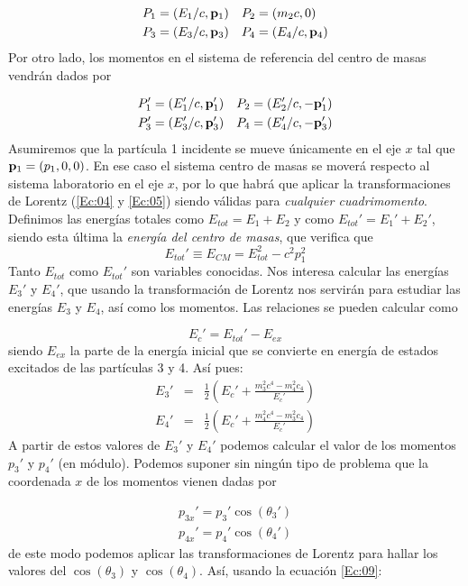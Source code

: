 \begin{eqnarray}
    P_1 = (E_1/c,\mathbf{p}_1) & \quad P_2 = (m_2c,0) \\
    P_3 = (E_3/c,\mathbf{p}_3) & \quad P_4 = (E_4/c,\mathbf{p}_4)
\end{eqnarray}
Por otro lado, los momentos en el sistema de referencia del centro de masas vendrán dados por

\begin{eqnarray}
    P_1' = (E_1'/c,\mathbf{p}_1') \quad P_2 = (E_2'/c,-\mathbf{p}_1') \\ 
    P_3' = (E_3'/c,\mathbf{p}_3') \quad P_4 = (E_4'/c,-\mathbf{p}_3')
\end{eqnarray}
Asumiremos que la partícula 1 incidente se mueve únicamente en el eje $x$ tal que $\mathbf{p}_1=(p_1,0,0)$. En ese caso el sistema centro de masas se moverá respecto al sistema laboratorio en el eje $x$, por lo que habrá que aplicar la transformaciones de Lorentz (\ref{Ec:04} y \ref{Ec:05}) siendo válidas para \textit{cualquier cuadrimomento}. Definimos las energías totales como $E_{tot}=E_1+E_2$ y como  $E_{tot}'=E_1'+E_2'$, siendo esta última la \textit{energía del centro de masas}, que verifica que
\begin{equation}
    E_{tot}' \equiv E_{CM} = E_{tot}^2 - c^2p_1^2 \label{Ec:18}
\end{equation}
Tanto $E_{tot}$ como $E_{tot}'$ son variables conocidas. Nos interesa calcular las energías $E_3'$ y $E_4'$, que usando la transformación de Lorentz nos servirán para estudiar las energías $E_3$ y $E_4$, así como los momentos. Las relaciones se pueden calcular como 

\begin{equation}
    E_c' = E_{tot}' - E_{ex}
\end{equation}
siendo $E_{ex}$ la parte de la energía inicial que se convierte en energía de estados excitados de las partículas 3 y 4. Así pues: 
\begin{eqnarray}
    E_3 ' & = & \frac{1}{2} \left( E_{c}' + \frac{m_3^2c^4- m_4^2c_4}{E_{c}'} \right) \\
    E_4 ' & = & \frac{1}{2} \left( E_{c}' + \frac{m_4^2c^4- m_3^2c_4}{E_{c}'} \right) 
\end{eqnarray}
A partir de estos valores de $E_3'$ y $E_4'$ podemos calcular el valor de los momentos $p_3'$ y $p_4'$ (en módulo). Podemos suponer sin ningún tipo de problema que la coordenada $x$ de los momentos vienen dadas por

\begin{eqnarray}
    p_{3x}' = p_3' \cos (\theta_3') \\
    p_{4x}' = p_4' \cos (\theta_4')
\end{eqnarray}
de este modo podemos aplicar las transformaciones de Lorentz para hallar los valores del $\cos (\theta_3)$ y $\cos (\theta_4)$. Así, usando la ecuación \ref{Ec:09}:

